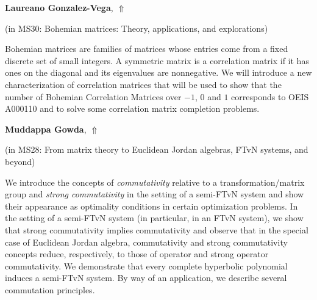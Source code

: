 \documentclass[ILAS2025-program.tex]{subfiles}
\begin{document}
\hypertarget{down0230}{}\begin{ilasabstract}
    
\textbf{Laureano Gonzalez-Vega},  \hfill \hyperlink{up0230}{$\Uparrow$}
    
    
(in {\color{mstitle}MS30: Bohemian matrices: Theory, applications, and explorations})
        
\mtskip
    Bohemian matrices are families of matrices whose entries come from a fixed discrete set of
small integers. A symmetric matrix is a correlation matrix if it has ones on the diagonal and
its eigenvalues are nonnegative. We will introduce a new characterization of correlation
matrices that will be used to show that the number of Bohemian Correlation Matrices over $-1$, $0$ and $1$ corresponds to OEIS A000110 and to solve some correlation matrix completion problems.
\end{ilasabstract}
    

\hypertarget{down0384}{}\begin{ilasabstract}
    
\textbf{Muddappa Gowda},  \hfill \hyperlink{up0384}{$\Uparrow$}
    
    
(in {\color{mstitle}MS28: From matrix theory to Euclidean Jordan algebras, FTvN systems, and beyond})
        
\mtskip
    We introduce the concepts of {\it commutativity} relative to a transformation/matrix group and {\it strong commutativity} in the setting of a semi-FTvN system and show their appearance as optimality conditions in certain optimization problems. In the setting of a semi-FTvN system (in particular, in an FTvN system), we show that strong commutativity implies commutativity and observe that in the special case of Euclidean Jordan algebra, commutativity and strong commutativity concepts reduce, respectively, to those of operator and strong operator commutativity. We demonstrate that every complete hyperbolic polynomial induces a semi-FTvN system. By way of an application, we describe several commutation principles. 


\end{ilasabstract}
    
\end{document}
